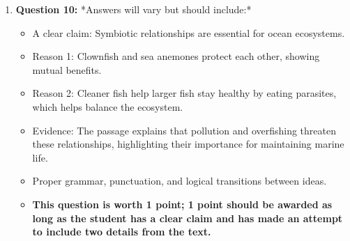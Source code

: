 \documentclass[12pt]{article}
\begin{document}
\begin{enumerate}
    \item \textbf{Question 10:}  
    *Answers will vary but should include:*  
    \begin{itemize}
        \item A clear claim: Symbiotic relationships are essential for ocean ecosystems.  
        \item Reason 1: Clownfish and sea anemones protect each other, showing mutual benefits.  
        \item Reason 2: Cleaner fish help larger fish stay healthy by eating parasites, which helps balance the ecosystem.  
        \item Evidence: The passage explains that pollution and overfishing threaten these relationships, highlighting their importance for maintaining marine life.  
        \item Proper grammar, punctuation, and logical transitions between ideas.  
        \item \textbf{This question is worth 1 point; 1 point should be awarded as long as the student has a clear claim and has made an attempt to include two details from the text.}
    \end{itemize}
\end{enumerate}
\end{document}
